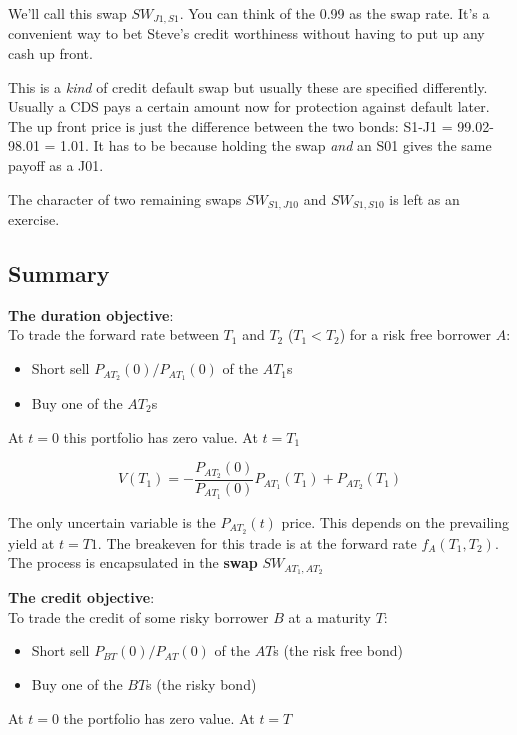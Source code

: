 We'll call this swap $SW_{J1,S1}$. You can think of the 0.99 as the swap rate. It's a convenient way to bet Steve's credit worthiness without having to put up any cash up front.

This is a \textit{kind} of credit default swap but usually these are specified differently. Usually a CDS pays a certain amount now for protection against default later. The up front price is just the difference between the two bonds: S1-J1 = 99.02-98.01 = 1.01. It has to be because holding the swap \textit{and} an S01 gives the same payoff as a J01. 

The character of two remaining swaps $SW_{S1,J10}$ and $SW_{S1,S10}$ is left as an exercise.

\subsection{Summary}

\textbf{The duration objective}:\\
To trade the forward rate between $T_1$ and $T_2$ ($T_1<T_2$) for a risk free borrower $A$:
\begin{itemize}
\item Short sell $P_{AT_2}(0)/P_{AT_1}(0)$ of the $AT_1$s\\
\item Buy one of the $AT_2$s
\end{itemize}

At $t=0$ this portfolio has zero value. At $t=T_1$

\[V(T_1) = -\frac{P_{AT_2}(0)}{P_{AT_1}(0)}P_{AT_1}(T_1) + P_{AT_2}(T_1)   \]

The only uncertain variable is the $P_{AT_2}(t)$ price. This depends on the prevailing yield at $t=T1$. The breakeven for this trade is at the forward rate $f_A(T_1,T_2)$. The process is encapsulated in the \textbf{swap} $SW_{AT_1,AT_2}$

\textbf{The credit objective}:\\
To trade the credit of some risky borrower $B$ at a maturity $T$:

\begin{itemize}
\item Short sell $P_{BT}(0)/P_{AT}(0)$ of the $AT$s (the risk free bond)\\
\item Buy one of the $BT$s (the risky bond)
\end{itemize}

At $t=0$ the portfolio has zero value. At $t=T$

